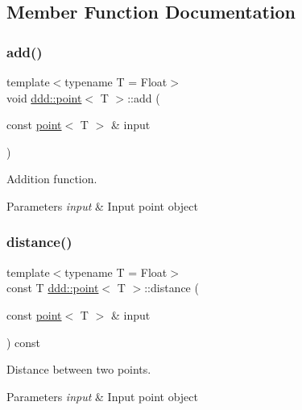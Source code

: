\subsection{Member Function Documentation}
\mbox{\label{classddd_1_1point_a66ad14a1d50eb4170c874f75b77e8b0b}} 
\subsubsection{\texorpdfstring{add()}{add()}}
{\footnotesize\ttfamily template$<$typename T = Float$>$ \\
void \hyperlink{classddd_1_1point}{ddd\+::point}$<$ T $>$\+::add (\begin{DoxyParamCaption}\item[{const \hyperlink{classddd_1_1point}{point}$<$ T $>$ \&}]{input }\end{DoxyParamCaption})\hspace{0.3cm}{\ttfamily [inline]}}



Addition function. 


\begin{DoxyParams}{Parameters}
{\em input} & Input point object \\
\hline
\end{DoxyParams}
\mbox{\label{classddd_1_1point_a59d8714cc178090ddf75b0c9dbd832c9}} 
\subsubsection{\texorpdfstring{distance()}{distance()}}
{\footnotesize\ttfamily template$<$typename T = Float$>$ \\
const T \hyperlink{classddd_1_1point}{ddd\+::point}$<$ T $>$\+::distance (\begin{DoxyParamCaption}\item[{const \hyperlink{classddd_1_1point}{point}$<$ T $>$ \&}]{input }\end{DoxyParamCaption}) const\hspace{0.3cm}{\ttfamily [inline]}}



Distance between two points. 


\begin{DoxyParams}{Parameters}
{\em input} & Input point object \\
\hline
\end{DoxyParams}
\mbox{\label{classddd_1_1point_a4b6793fd154fc9ad4dd93a4927d4ee13}} 
